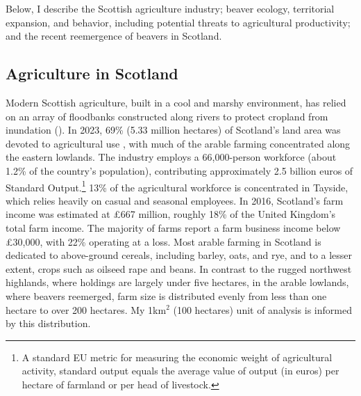 
Below, I describe the Scottish agriculture industry; beaver ecology, territorial expansion, and behavior, including potential threats to agricultural productivity; and the recent reemergence of beavers in Scotland. 

\subsection{Agriculture in Scotland}
Modern Scottish agriculture, built in a cool and marshy environment, has relied on an array of floodbanks constructed along rivers to protect cropland from inundation (\cite{goldfarb_eager_2018}). In 2023, 69\% (5.33 million hectares) of Scotland's land area was devoted to agricultural use \citep{cabinet_secretary_for_rural_affairs_land_reform_and_islands_results_2023}, with much of the arable farming concentrated along the eastern lowlands. The industry employs a 66,000-person workforce (about 1.2\% of the country's population), contributing approximately 2.5 billion euros of Standard Output.\footnote{A standard EU metric for measuring the economic weight of agricultural activity, standard output equals the average value of output (in euros) per hectare of farmland or per head of livestock.} 13\% of the agricultural workforce is concentrated in Tayside, which relies heavily on casual and seasonal employees. In 2016, Scotland's farm income was estimated at \pounds 667 million, roughly 18\% of the United Kingdom's total farm income. The majority of farms report a farm business income below \pounds 30,000, with 22\% operating at a loss. Most arable farming in Scotland is dedicated to above-ground cereals, including barley, oats, and rye, and to a lesser extent, crops such as oilseed rape and beans. In contrast to the rugged northwest highlands, where holdings are largely under five hectares, in the arable lowlands, where beavers reemerged, farm size is distributed evenly from less than one hectare to over 200 hectares. My 1km$^2$ (100 hectares) unit of analysis is informed by this distribution.

